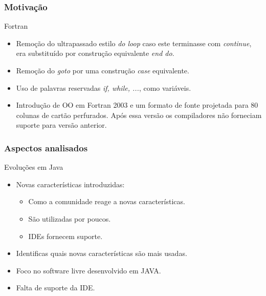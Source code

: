 \documentclass[]{beamer}
\begin{document}
	\begin{frame}[label=Motivação]
		\frametitle{Motivação}
		\begin{block}{Fortran}
			\begin{itemize}
				\item Remoção do ultrapassado estilo \textit{do loop} caso este terminasse com \textit{continue}, era substituído por construção equivalente \textit{end do}.
				
				\item Remoção do \textit{goto} por uma construção \textit{case} equivalente.
				
				\item Uso de palavras reservadas \textit{if, while, ...}, como variáveis.
				
				\item Introdução de OO em Fortran 2003 e um formato de fonte projetada para 80 colunas de cartão perfurados. Após essa versão os compiladores não forneciam suporte para versão anterior.
			\end{itemize}
		\end{block}
	\end{frame}
	
	\begin{frame}[label=AspectosAnalisados]
		\frametitle{Aspectos analisados}
		\begin{block}{Evoluções em Java}
			\begin{itemize}
				\item Novas características introduzidas:
					\begin{itemize}
						\item Como a comunidade reage a novas características.
						\item São utilizadas por poucos.
						\item IDEs fornecem suporte.
					\end{itemize}
					
				\item Identificas quais novas características são mais usadas.
				\item Foco no software livre desenvolvido em JAVA.
				\item Falta de suporte da IDE.
			\end{itemize}
		\end{block}
	\end{frame}
	
\end{document}
